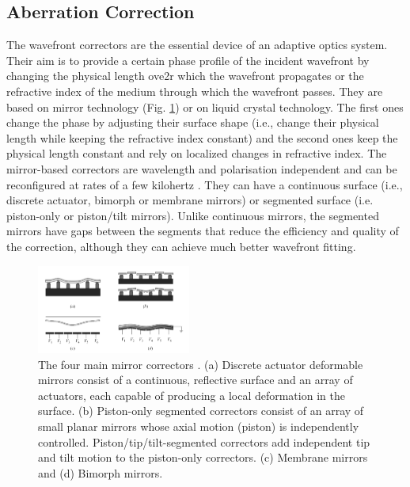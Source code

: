 \subsection{Aberration Correction}
\label{sec:AberrationCorrection}

The wavefront correctors are the essential device of an adaptive optics system. Their aim is to provide a certain phase profile of the incident wavefront by changing the physical length ove2r which the wavefront propagates or the refractive index of the medium through which the wavefront passes. They are based on mirror technology (Fig. \ref{fig:Correctors}) or on liquid crystal technology. The first ones change the phase by adjusting their surface shape (i.e., change their physical length while keeping the refractive index constant) and the second ones keep the physical length constant and rely on localized changes in refractive index. The mirror-based correctors are wavelength and polarisation independent and can be reconfigured at rates of a few kilohertz \cite{AOM_basic_ref}. They can have a continuous surface (i.e., discrete actuator, bimorph or membrane mirrors) or segmented surface (i.e. piston-only or piston/tilt mirrors). Unlike continuous mirrors, the segmented mirrors have gaps between the segments that reduce the efficiency and quality of the correction, although they can achieve much better wavefront fitting. 

\begin{figure}[htbp]
	\centering
		\includegraphics[width=0.45\textwidth]{images/Correctors.png}
	\caption{The four main mirror correctors \cite{AO_vision_science}. (a) Discrete actuator deformable mirrors consist of a continuous, reflective surface and an array of actuators, each capable of producing a local deformation in the surface. (b) Piston-only segmented correctors consist of an array of small planar mirrors whose axial motion (piston) is independently controlled. Piston/tip/tilt-segmented correctors add independent tip and tilt motion to the piston-only correctors. (c) Membrane mirrors and (d) Bimorph mirrors.}
	\label{fig:Correctors}
\end{figure}



